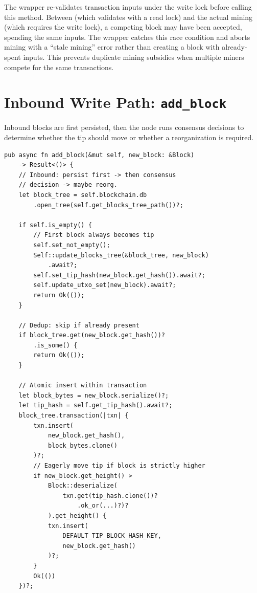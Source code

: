 \begin{notebox}
The  wrapper re-validates transaction inputs under the write lock before calling this method. Between  (which validates with a read lock) and the actual mining (which requires the write lock), a competing block may have been accepted, spending the same inputs. The wrapper catches this race condition and aborts mining with a ``stale mining'' error rather than creating a block with already-spent inputs. This prevents duplicate mining subsidies when multiple miners compete for the same transactions.
\end{notebox}

\section{Inbound Write Path: \texttt{add\_block}}
\label{sec:ch11-inbound-write}

Inbound blocks are first persisted, then the node runs consensus decisions to determine whether the tip should move or whether a reorganization is required.

\begin{listing}[htbp]
\caption{Inbound block persistence and dedup (part 1)}
\label{lst:ch11-add-block-1}
\begin{verbatim}
pub async fn add_block(&mut self, new_block: &Block)
    -> Result<()> {
    // Inbound: persist first -> then consensus
    // decision -> maybe reorg.
    let block_tree = self.blockchain.db
        .open_tree(self.get_blocks_tree_path())?;

    if self.is_empty() {
        // First block always becomes tip
        self.set_not_empty();
        Self::update_blocks_tree(&block_tree, new_block)
            .await?;
        self.set_tip_hash(new_block.get_hash()).await?;
        self.update_utxo_set(new_block).await?;
        return Ok(());
    }

    // Dedup: skip if already present
    if block_tree.get(new_block.get_hash())?
        .is_some() {
        return Ok(());
    }

    // Atomic insert within transaction
    let block_bytes = new_block.serialize()?;
    let tip_hash = self.get_tip_hash().await?;
    block_tree.transaction(|txn| {
        txn.insert(
            new_block.get_hash(),
            block_bytes.clone()
        )?;
        // Eagerly move tip if block is strictly higher
        if new_block.get_height() >
            Block::deserialize(
                txn.get(tip_hash.clone())?
                    .ok_or(...)?)?
            ).get_height() {
            txn.insert(
                DEFAULT_TIP_BLOCK_HASH_KEY,
                new_block.get_hash()
            )?;
        }
        Ok(())
    })?;
\end{verbatim}
\end{listing}

